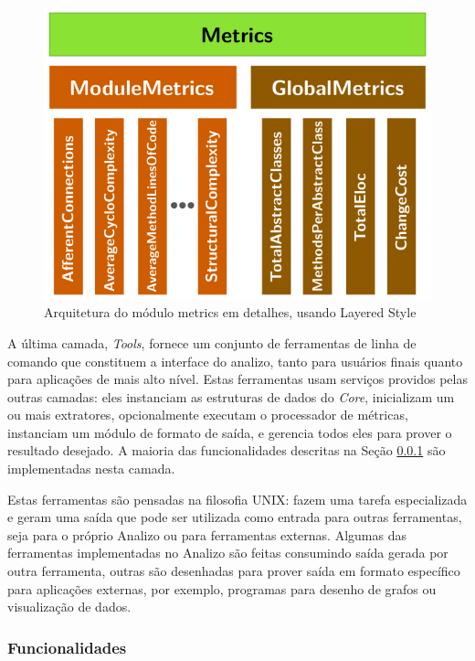 \begin{figure}[h]
\center
\includegraphics[scale=0.4]{imagens/analizo-metrics-architecture.png}
\caption{Arquitetura do módulo metrics em detalhes, usando Layered Style \cite{Clements2002}}
\label{arquitetura-metrics-analizo}
\end{figure}

A última camada, {\it Tools}, fornece um conjunto de ferramentas de linha de comando que
constituem a interface do analizo, tanto para usuários finais quanto para
aplicações de mais alto nível. Estas ferramentas usam serviços providos pelas
outras camadas: eles instanciam as estruturas de dados do {\it Core},
inicializam um ou mais extratores, opcionalmente executam o processador de
métricas, instanciam um módulo de formato de saída, e gerencia todos eles para
prover o resultado desejado. A maioria das funcionalidades descritas na Seção
\ref{funcionalidades} são implementadas nesta camada.

Estas ferramentas são pensadas na filosofia UNIX: fazem uma tarefa
especializada e geram uma saída que pode ser utilizada como entrada para outras
ferramentas, seja para o próprio Analizo ou para ferramentas externas. Algumas
das ferramentas implementadas no Analizo são feitas consumindo saída gerada por
outra ferramenta, outras são desenhadas para prover saída em formato específico
para aplicações externas, por exemplo, programas para desenho de grafos ou
visualização de dados.

\subsubsection{Funcionalidades}\label{funcionalidades}

